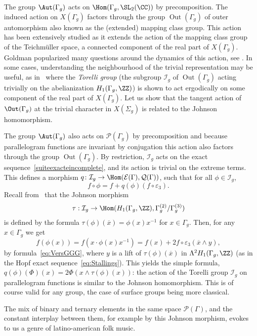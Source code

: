 The group $\Aut(\Gamma_g)$ acts on $\Hom(\Gamma_g,\SL_2(\CC))$ by precomposition.
The induced action on $X(\Gamma_g)$ factors through the group
$\operatorname{Out}(\Gamma_g)$ of outer automorphism also known as the
(extended) mapping class group. This action has been extensively studied as
it extends the action of the mapping class group of the Teichmüller space,
a connected component of the real part of $X(\Gamma_g)$.
Goldman popularized many questions around the dynamics of this action,
see \eg \cite{goldman06}.
In some cases, understanding the neighbourhood of the trivial representation
may be useful, as in~\cite{FunarMarche} where the
{\em Torelli group} (\ie the subgroup
$\mathcal{I}_g$ of $\operatorname{Out}(\Gamma_g)$ acting trivially on
the abelianization $H_1(\Gamma_g,\ZZ)$) is shown to
act ergodically on some component of the real part of $X(\Gamma_g)$.
Let us show that the tangent action of $\Out(\Gamma_g)$ at the trivial
character in $X(\Sigma_g)$ is related to the Johnson homomorphism.

The group $\Aut(\Gamma_g)$ also acts on $\mathcal{P}(\Gamma_g)$
by precomposition and because parallelogram functions are invariant by
conjugation this action also factors through the group
$\operatorname{Out}(\Gamma_g)$.
By restriction, $\mathcal{I}_g$ acts on the exact
sequence~\eqref{suiteexacteincomplete},
and its action is trivial
on the extreme terms.
This
defines a morphism
$q\colon\mathcal{I}_g\to\Hom(\mathcal{E}(\Gamma),\mathcal{Q}(\Gamma))$,
such that for all $\phi\in\mathcal{I}_g$,
\[ f\circ\phi=f+q(\phi)(f\circ\varepsilon_3). \]
Recall from~\cite[Chap.\,6]{farbmargalit} that the Johnson morphism
\[
\tau:\mathcal{I}_g\to \Hom(H_1(\Gamma_g,\ZZ),\Gamma_g^{(2)}/\Gamma_g^{(3)})
\]
is defined by the formula $\tau(\phi)(\overline{x})=\phi(x)x^{-1}$ for
$x\in\Gamma_g$. Then, for any $x\in \Gamma_g$ we get
\[ f(\phi(x))=f(x\cdot \phi(x)x^{-1})=
f(x)+2f\circ\varepsilon_3(\overline{x}\wedge y), \]
by formula~\eqref{eq:VersGGG}, where $y$ is a lift of
$\tau(\phi)(\overline{x})$ in $\Lambda^2 H_1(\Gamma_g,\ZZ)$
(as in the Hopf exact sequence~\eqref{eq:Stallings}). This yields the simple
formula, $q(\phi)(\Phi)(x)=2\Phi(x\wedge \tau(\phi)(x))$: the action of the
Torelli group $\mathcal{I}_g$ on parallelogram functions is similar to the
Johnson homomorphism. This is of course valid for any group, the case of
surface groups being more classical.

The mix of binary and ternary elements in the same space
$\mathcal{P}(\Gamma)$, and the constant interplay between them, for example
by this Johnson morphism, evokes to us a genre of latino-american folk music.

